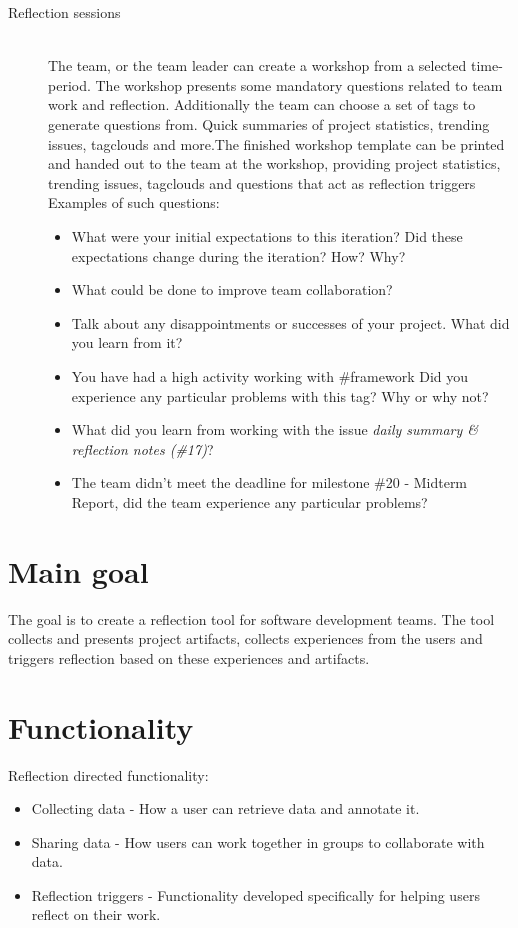 \begin{description}
	\item[Reflection sessions] \hfill \\
	The team, or the team leader can create a workshop from a selected time-period. The workshop presents some mandatory questions
	related to team work and reflection. Additionally the team can choose a set of tags to generate questions from. Quick summaries of project statistics, trending issues, tagclouds and more.The finished workshop template can be printed and
	handed out to the team at the workshop, providing project statistics, trending issues, tagclouds and questions that act as reflection triggers\\
	Examples of such questions: 
		\begin{itemize}
			\item What were your initial expectations to this iteration? Did these expectations change during the iteration? How? Why?
			\item What could be done to improve team collaboration?
			\item Talk about any disappointments or successes of your project. What did you learn from it?
			\item You have had a high activity working with \#framework Did you experience any particular problems with this tag? Why or why not?
			\item What did you learn from working with the issue \textit{daily summary \& reflection notes (\#17)}?
			\item The team didn't meet the deadline for milestone \#20 - Midterm Report, did the team experience any particular problems?
		\end{itemize}
\end{description}

\section{Main goal}
The goal is to create a reflection tool for software development teams. The tool collects and presents project artifacts, collects experiences from the users and triggers reflection based on these experiences and artifacts. 

\section{Functionality}
Reflection directed functionality:
\begin{itemize}
\item Collecting data - How a user can retrieve data and annotate it. 
\item Sharing data - How users can work together in groups to collaborate with data. 
\item Reflection triggers - Functionality developed specifically for helping users reflect on their work.
\end{itemize}

